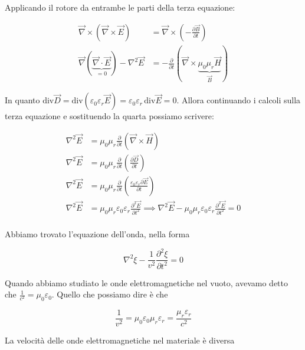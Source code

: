 Applicando il rotore da entrambe le parti della terza equazione:

\begin{equation*}
	\begin{aligned}
		\vec{\nabla} \times (\vec{\nabla} \times \vec{E} ) &= \vec{\nabla} \times \left( -\frac{\partial \vec{B}}{\partial t}  \right) \\
		\vec{\nabla} ( \underbrace{\vec{\nabla} \cdot \vec{E}}_{=0} )-\nabla^2 \vec{E}  &= - \frac{\partial}{\partial t} ( \vec{\nabla} \times \underbrace{\mu_0 \mu_r \vec{H}}_{\vec{B}} )
	\end{aligned}
\end{equation*}

In quanto $ \text{div}\vec{D} = \text{div}(\varepsilon_0 \varepsilon_r \vec{E} )=\varepsilon_0 \varepsilon_r \,\text{div}\vec{E} = 0 $. Allora continuando i calcoli sulla terza equazione e sostituendo la quarta possiamo scrivere:

\begin{equation*}
	\begin{aligned}
		\nabla^2 \vec{E}  &= \mu_0 \mu_r \frac{\partial}{\partial t} ( \vec{\nabla} \times \vec{H}) \\
		\nabla^2 \vec{E}  &= \mu_0 \mu_r \frac{\partial}{\partial t} \left(\frac{\partial \vec{D}}{\partial t} \right) \\
		\nabla^2 \vec{E}  &= \mu_0 \mu_r \frac{\partial}{\partial t} \left(\frac{\varepsilon_0 \varepsilon_r \partial \vec{E}}{\partial t} \right) \\
		\nabla^2 \vec{E}  &= \mu_0 \mu_r \varepsilon_0 \varepsilon_r \frac{\partial^2 \vec{E}}{\partial t^2} \implies \nabla^2 \vec{E}  - \mu_0 \mu_r \varepsilon_0 \varepsilon_r \frac{\partial^2 \vec{E}}{\partial t^2} = 0\\
	\end{aligned}
\end{equation*}

Abbiamo trovato l'equazione dell'onda, nella forma

\[
	\nabla^2 \xi - \frac{1}{v^2} \frac{\partial^2 \xi}{\partial t^2} =0
\]

Quando abbiamo studiato le onde elettromagnetiche nel vuoto, avevamo detto che $ \frac{1}{c^2}=\mu_0 \varepsilon_0  $. Quello che possiamo dire è che

\[
	\boxed{\frac{1}{v^2}= \mu_0 \varepsilon_0 \mu_r \varepsilon_r =\frac{\mu_r \varepsilon_r}{c^2}}
\]

La velocità delle onde elettromagnetiche nel materiale è diversa

